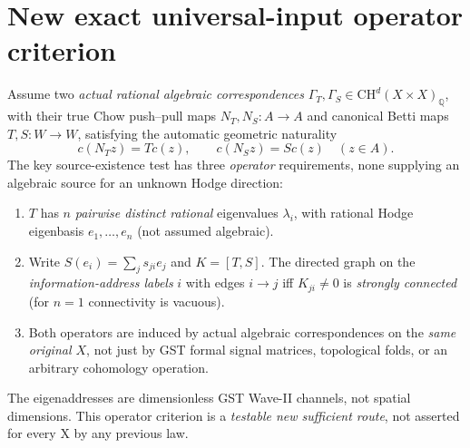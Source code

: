 \documentclass[11pt]{article}
\newcommand{\Q}{\mathbb Q}
\newcommand{\CH}{\mathrm{CH}}
\begin{document}
\section{New exact universal-input operator criterion}
Assume two \emph{actual rational algebraic correspondences} $\Gamma_T,\Gamma_S\in\CH^d(X\times X)_\Q$, with their true Chow push--pull maps $N_T,N_S:A\to A$ and canonical Betti maps $T,S:W\to W$, satisfying the automatic geometric naturality
\[
 c(N_Tz)=Tc(z),\qquad c(N_Sz)=Sc(z)\quad(z\in A).
\]
The key source-existence test has three \emph{operator} requirements, none supplying an algebraic source for an unknown Hodge direction:
\begin{enumerate}
\item $T$ has $n$ \emph{pairwise distinct rational} eigenvalues $\lambda_i$, with rational Hodge eigenbasis $e_1,\ldots,e_n$ (not assumed algebraic).
\item Write $S(e_i)=\sum_j s_{ji}e_j$ and $K=[T,S]$. The directed graph on the \emph{information-address labels} $i$ with edges $i\to j$ iff $K_{ji}\ne0$ is \emph{strongly connected} (for $n=1$ connectivity is vacuous).
\item Both operators are induced by actual algebraic correspondences on the \emph{same original $X$}, not just by GST formal signal matrices, topological folds, or an arbitrary cohomology operation.
\end{enumerate}
The eigenaddresses are dimensionless GST Wave-II channels, not spatial dimensions. This operator criterion is a \emph{testable new sufficient route}, not asserted for every X by any previous law.
\end{document}
